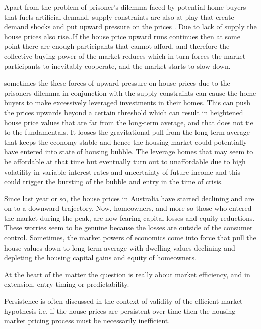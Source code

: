 \documentclass[AEJ,reqno, draftmode]{AEA}
\begin{document}
Apart from the problem of prisoner's dilemma faced by potential home buyers that fuels artificial demand, supply constraints are also at play that create demand shocks and put upward pressure on the prices \citep{Paciorek2013SupplyDynamics}. Due to lack of supply the house prices also rise..If the house price upward runs continues then at some point there are enough participants that cannot afford, and therefore the collective buying power of the market reduces which in turn forces the market participants to inevitably cooperate, and the market starts to slow down.

sometimes the these forces of upward pressure on house prices due to the prisoners dilemma in conjunction with the supply constraints can cause the home buyers to make excessively leveraged investments in their homes. This can push the prices upwards beyond a certain threshold which can result in heightened house price values that are far from the long-term average, and that does not tie to the fundamentals. It looses the gravitational pull from the long term average that keeps the economy stable and hence the housing market could potentially have entered into state of housing bubble. The leverage homes that may seem to be affordable at that time but eventually turn out to unaffordable due to high volatility in variable interest rates and uncertainty of future income and this could trigger the bursting of the bubble and entry in the time of crisis.

Since last year or so, the house prices in Australia have started declining and are on to a downward trajectory. Now, homeowners, and more so those who entered the market during the peak, are now fearing capital losses and equity reductions. These worries seem to be genuine because the losses are outside of the consumer control. Sometimes, the market powers of economics come into force that pull the house values down to long term average with dwelling values declining and depleting the housing capital gains and equity of homeowners. 


At the heart of the matter the question is really about market efficiency, and in extension, entry-timing or predictability.

Persistence is often discussed in the context of validity of the efficient market hypothesis \citep{schindler2014persistence} i.e. if the house prices are persistent over time then the housing market pricing process must be necessarily inefficient. 
\end{document}
